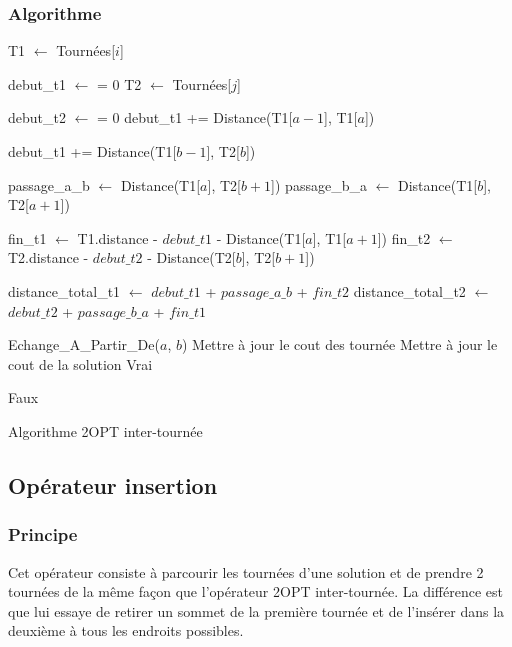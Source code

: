 \documentclass{article}
\begin{document}
\subsubsection{Algorithme}
\begin{algorithm}[H]
  {
    T1 $\leftarrow$ Tournées[$i$]\;
    {
      debut\_t1 $\leftarrow$ = 0\;
      T2 $\leftarrow$ Tournées[$j$]\;
      {
        debut\_t2 $\leftarrow$ = 0\;
        debut\_t1 += Distance(T1[$a - 1$], T1[$a$])\;
        {
          debut\_t1 += Distance(T1[$b - 1$], T2[$b$])\;

          passage\_a\_b $\leftarrow$ Distance(T1[$a$], T2[$b + 1$])\;
          passage\_b\_a $\leftarrow$ Distance(T1[$b$], T2[$a + 1$])\;

          fin\_t1 $\leftarrow$ T1.distance - $debut\_t1$ - Distance(T1[$a$], T1[$a + 1$])\;
          fin\_t2 $\leftarrow$ T2.distance - $debut\_t2$ - Distance(T2[$b$], T2[$b + 1$])\;

          distance\_total\_t1 $\leftarrow$ $debut\_t1$ + $passage\_a\_b$ + $fin\_t2$\;
          distance\_total\_t2 $\leftarrow$ $debut\_t2$ + $passage\_b\_a$ + $fin\_t1$\;
          
          {
            Echange\_A\_Partir\_De($a$, $b$)\;
            Mettre à jour le cout des tournée\;
            Mettre à jour le cout de la solution\;
            \Return Vrai\;
          }
        }
      }
    }
  }
  \Return Faux\;
  \caption{Algorithme 2OPT inter-tournée}
\end{algorithm}

\subsection{Opérateur insertion}
\subsubsection{Principe}
Cet opérateur consiste à parcourir les tournées d'une solution et de prendre 2 tournées
de la même façon que l'opérateur 2OPT inter-tournée. La différence est que lui essaye
de retirer un sommet de la première tournée et de l'insérer dans la deuxième à tous les
endroits possibles.
\end{document}
